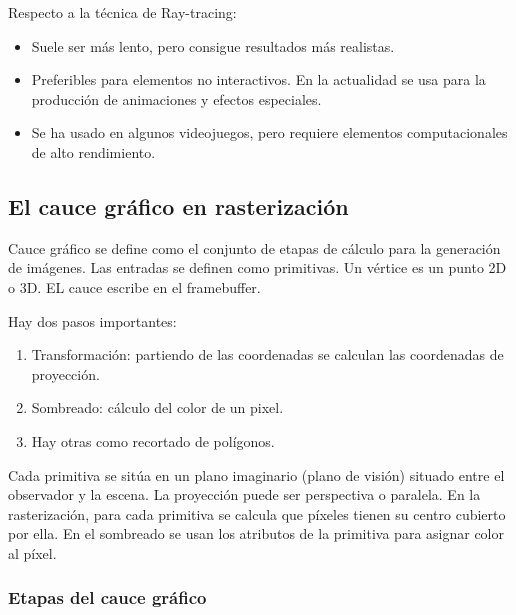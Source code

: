 \documentclass[12pt]{report} %
\providecommand{\tightlist}{%
  \setlength{\itemsep}{0pt}\setlength{\parskip}{0pt}}
\begin{document}
Respecto a la técnica de Ray-tracing:

\begin{itemize}
\tightlist
\item
  Suele ser más lento, pero consigue resultados más realistas.\\
\item
  Preferibles para elementos no interactivos. En la actualidad se usa
  para la producción de animaciones y efectos especiales.\\
\item
  Se ha usado en algunos videojuegos, pero requiere elementos
  computacionales de alto rendimiento.
\end{itemize}

\hypertarget{el-cauce-gruxe1fico-en-rasterizaciuxf3n}{%
\subsection{El cauce gráfico en
rasterización}\label{el-cauce-gruxe1fico-en-rasterizaciuxf3n}}

Cauce gráfico se define como el conjunto de etapas de cálculo para la
generación de imágenes. Las entradas se definen como primitivas. Un
vértice es un punto 2D o 3D. EL cauce escribe en el framebuffer.

Hay dos pasos importantes:

\begin{enumerate}
\def\labelenumi{\arabic{enumi}.}
\tightlist
\item
  Transformación: partiendo de las coordenadas se calculan las
  coordenadas de proyección.\\
\item
  Sombreado: cálculo del color de un pixel.\\
\item
  Hay otras como recortado de polígonos.
\end{enumerate}

Cada primitiva se sitúa en un plano imaginario (plano de visión) situado
entre el observador y la escena. La proyección puede ser perspectiva o
paralela. En la rasterización, para cada primitiva se calcula que
píxeles tienen su centro cubierto por ella. En el sombreado se usan los
atributos de la primitiva para asignar color al píxel.

\hypertarget{etapas-del-cauce-gruxe1fico}{%
\subsubsection{Etapas del cauce
gráfico}\label{etapas-del-cauce-gruxe1fico}}
\end{document}
